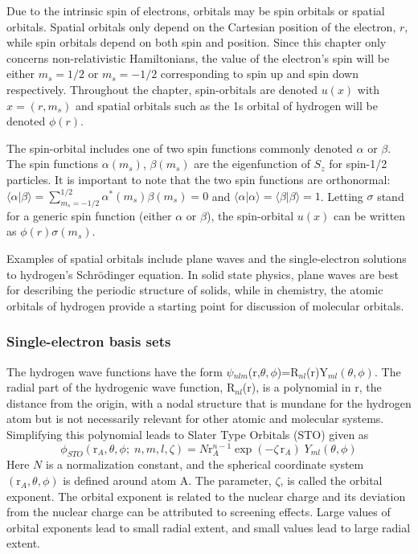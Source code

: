 \documentclass[11pt,oneside,final]{huthesis}%
\begin{document}
Due to the intrinsic spin of electrons, orbitals may be spin orbitals or spatial orbitals. Spatial orbitals only depend on the Cartesian position of the electron, $r$, while spin orbitals depend on both spin and position.  Since this chapter only concerns non-relativistic Hamiltonians, the value of the electron's spin will be either $m_{s}=1/2$ or $m_s=-1/2$ corresponding to spin up and spin down respectively.  Throughout the chapter, spin-orbitals are denoted $u(x)$ with $x=(r,m_s)$ and spatial orbitals such as the 1s orbital of hydrogen will be denoted $\phi(r)$. 

The spin-orbital includes one of two spin functions commonly denoted $\alpha$ or $\beta$.    The spin functions $\alpha (m_{s} )$,  $\beta (m_{s} )$ are the eigenfunction of ${S}_{z}$ for spin-1/2 particles. It is important to note that the two spin functions are orthonormal: $\langle \alpha |\beta \rangle =\sum _{m_{s} =-1/2}^{1/2} \alpha ^{*} (m_{s} )\beta (m_{s} )=0$ and $\langle \alpha |\alpha \rangle =\langle \beta |\beta \rangle =1$. 
Letting $\sigma$ stand for a generic spin function (either $\alpha$ or $\beta$), the spin-orbital $u(x)$ can be written as $\phi (r)\sigma (m_{s} )$.

Examples of spatial orbitals include plane waves and the single-electron solutions to hydrogen's Schr\"odinger equation.  In solid state physics, plane waves are best for describing the periodic structure of solids, while in chemistry, the atomic orbitals of hydrogen provide a starting point for discussion of molecular orbitals. 

\subsubsection{Single-electron basis sets}\label{sec:basis-set}
The hydrogen wave functions have the form $\psi $${}_{ nlm}$(r,$\theta ,\phi$)=R${}_{nl}$(r)Y${}_{ml}$$\left(\theta ,\phi\right).$ The radial part of the hydrogenic wave function, R${}_{nl}$(r), is a polynomial in r, the distance from the origin, with a nodal structure that is mundane for the hydrogen atom but is not necessarily relevant for other atomic and molecular systems. Simplifying this polynomial leads to Slater Type Orbitals (STO) given as
\begin{equation} \label{GrindEQ__7_4_} 
\phi _{STO} (\textrm{r}_{A} ,\theta ,\phi ;\; n,m,l,\zeta )=N\textrm{r}_{A}^{n-1} \exp (-\zeta \, \textrm{r}_{A} )\; Y_{ml} (\theta ,\phi )
\end{equation} 
Here $N$ is a normalization constant, and the spherical coordinate system $(\textrm{r}_{A},\theta,\phi)$ is defined around atom A.  The parameter, $\zeta$, is called the {orbital exponent}.  The orbital exponent is related to the nuclear charge and its deviation from the nuclear charge can be attributed to screening effects.  Large values of orbital exponents lead to small radial extent, and small values lead to large radial extent. 
\end{document}
